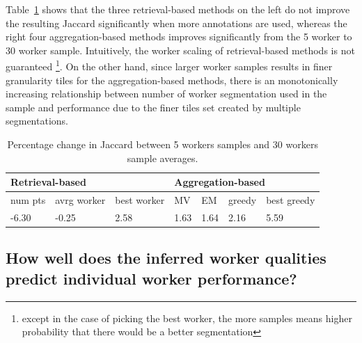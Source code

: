     \par Table~\ref{workerScaling} shows that the three retrieval-based methods on the left do not improve the resulting Jaccard significantly when more annotations are used, whereas the right four aggregation-based methods improves significantly from the 5 worker to 30 worker sample. Intuitively, the worker scaling of retrieval-based methods is not guaranteed \footnote{except in the case of picking the best worker, the more samples means higher probability that there would be a better segmentation}. On the other hand, since larger worker samples results in finer granularity tiles for the aggregation-based methods, there is an monotonically increasing relationship between number of worker segmentation used in the sample and performance due to the finer tiles set created by multiple segmentations.
      \begin{table}
      \small
        \setlength\tabcolsep{1.5pt}
        \begin{tabular}{l|l|l|llll}
\multicolumn{3}{l|}{Retrieval-based} & \multicolumn{4}{l}{Aggregation-based}                                                             \\ \hline
num pts  & avrg worker & best worker & \multicolumn{1}{l|}{MV}   & \multicolumn{1}{l|}{EM}   & \multicolumn{1}{l|}{greedy} & best greedy \\ \hline
-6.30    & -0.25       & 2.58        & \multicolumn{1}{l|}{1.63} & \multicolumn{1}{l|}{1.64} & \multicolumn{1}{l|}{2.16}   & 5.59       
\end{tabular}
        \caption{Percentage change in Jaccard between 5 workers samples and 30 workers sample averages.}
        \label{workerScaling}
        \vspace{-10pt}
      \end{table}
  \subsection{How well does the inferred worker qualities predict individual worker performance?}
